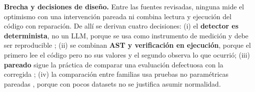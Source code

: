 \textbf{Brecha y decisiones de diseño.} Entre las fuentes revisadas, ninguna mide el optimismo con una intervención pareada ni combina lectura y ejecución del código con reparación. De allí se derivan cuatro decisiones: (i) el \textbf{detector es determinista}, no un LLM, porque se usa como instrumento de medición y debe ser reproducible \parencite{zheng2023}; (ii) se combinan \textbf{AST y verificación en ejecución}, porque el primero lee el código pero no sus valores y el segundo observa lo que ocurrió; (iii) \textbf{\DOpt{} pareado} sigue la práctica de comparar una evaluación defectuosa con la corregida \parencite{kapoor2023,cawley2010}; (iv) la comparación entre familias usa pruebas no paramétricas pareadas \parencite{demsar2006}, porque con pocos datasets no se justifica asumir normalidad.
